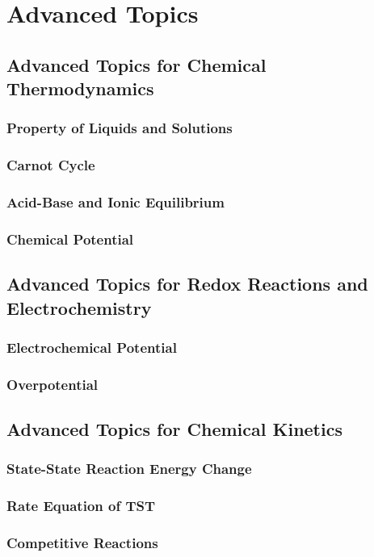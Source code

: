 \section{Advanced Topics}
\subsection{Advanced Topics for Chemical Thermodynamics}
\subsubsection{Property of Liquids and Solutions}
\subsubsection{Carnot Cycle}
\subsubsection{Acid-Base and Ionic Equilibrium}
\subsubsection{Chemical Potential}

\newpage
\subsection{Advanced Topics for Redox Reactions and Electrochemistry}
\subsubsection{Electrochemical Potential}
\subsubsection{Overpotential}

\newpage
\subsection{Advanced Topics for Chemical Kinetics}
\subsubsection{State-State Reaction Energy Change}
\subsubsection{Rate Equation of TST}
\subsubsection{Competitive Reactions}
